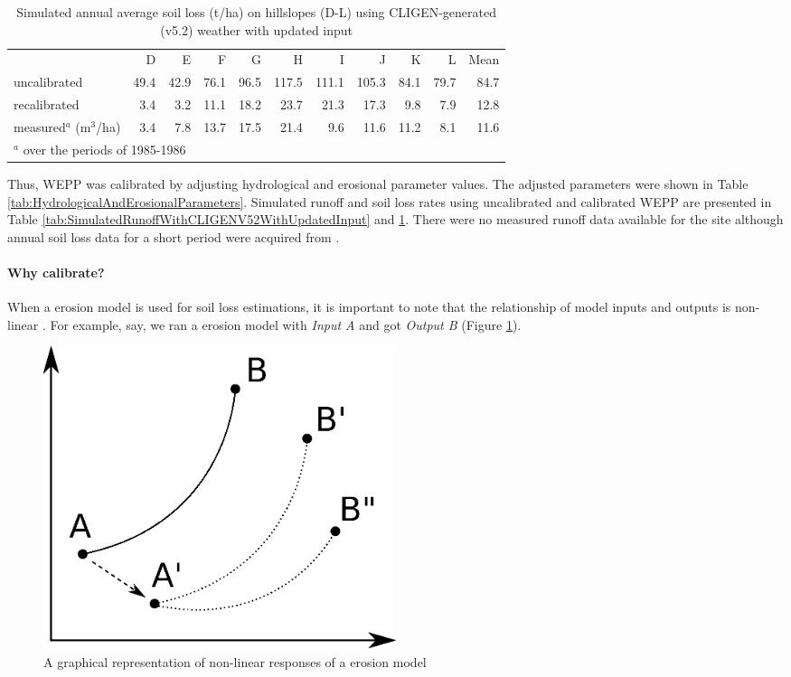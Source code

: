 \begin{table}[htbp]
  \centering
  \caption[Simulated annual average soil loss on hillslopes using
CLIGEN-generated weather with updated input]{Simulated annual average soil loss
(t/ha) on hillslopes (D-L) using CLIGEN-generated (v5.2) weather with updated
input}
  \label{tab:SimulatedSoilLossWithCLIGENV52WithUpdatedInput}
  \footnotesize
    \begin{tabular}{lrrrrrrrrrr}
      \toprule
      & D & E & F & G & H & I & J & K & L & Mean\\
      \cmidrule{2-11}
      uncalibrated & 49.4 & 42.9 & 76.1 & 96.5 & 117.5 & 111.1 & 105.3 & 84.1 &
79.7 & 84.7\\
      recalibrated & 3.4 & 3.2 & 11.1 & 18.2 & 23.7 & 21.3 & 17.3 & 9.8 & 7.9 &
12.8\\
      measured$^a$ (m$^3$/ha) & 3.4 & 7.8 & 13.7 & 17.5 & 21.4 & 9.6 & 11.6 &
11.2 & 8.1 & 11.6\\
      \bottomrule
      \multicolumn{8}{l}{\footnotesize $^a$ over the periods of 1985-1986
\citep[From][]{favis-mortlock1998-141}}
    \end{tabular}
\end{table}

Thus, WEPP was calibrated by adjusting hydrological and
erosional parameter values. The adjusted parameters were shown in Table
\ref{tab:HydrologicalAndErosionalParameters}. Simulated runoff and soil
loss rates using uncalibrated and calibrated WEPP are presented in Table
\ref{tab:SimulatedRunoffWithCLIGENV52WithUpdatedInput} and
\ref{tab:SimulatedSoilLossWithCLIGENV52WithUpdatedInput}. There were no measured
runoff data available for the site although annual soil loss data for a short
period were acquired from \citet{favis-mortlock1998-141}.

\paragraph{Why calibrate?} When a erosion model is used for soil loss
estimations, it is important to note that the relationship of model inputs and
outputs is non-linear \citep{favis-mortlock1995-365,jetten1999-521}. For
example, say, we ran a erosion model with \emph{Input A} and got \emph{Output B}
(Figure \ref{fig:calibration}).

\begin{figure}[htbp]
  \centering
    \includegraphics[width=0.5\textwidth]{./img/calibration}
  \caption{A graphical representation of non-linear responses of a erosion
model}
  \label{fig:calibration}
\end{figure}

